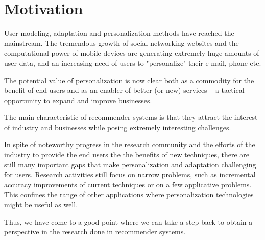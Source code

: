 \section{Motivation}

 User modeling, adaptation and personalization methods have reached the mainstream. The tremendous growth of social networking websites and the computational power of mobile devices are generating extremely huge amounts of user data, and an increasing need of users to "personalize" their e-mail, phone etc.

 The potential value of personalization is now clear both as a commodity for the benefit of end-users and as an enabler of better (or new) services – a tactical opportunity to expand and improve businesses.

 The main characteristic of recommender systems is that they attract the interest of industry and businesses while posing extremely interesting challenges.

 In spite of noteworthy progress in the research community and the efforts of the industry to provide the end users the the benefits of new techniques, there are still many important gaps that make personalization and adaptation challenging for users. Research activities still focus on narrow problems, such as incremental accuracy improvements of current techniques or on a few applicative problems. This confines the range of other applications where personalization technologies might be useful as well.

 Thus, we have come to a good point where we can take a step back to obtain a perspective in the research done in recommender systems.

